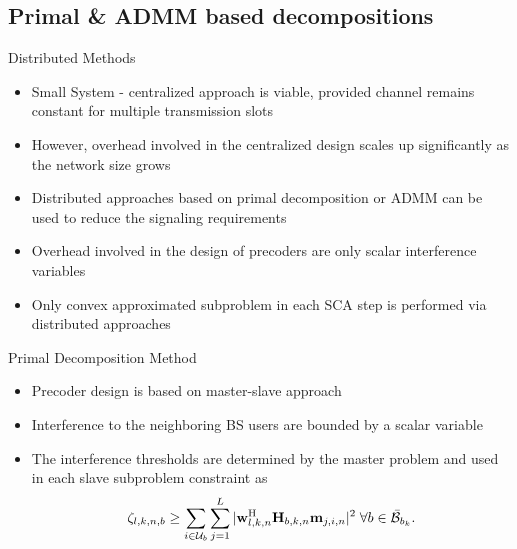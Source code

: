 \documentclass[9pt]{beamer}
\begin{document}
\subsection{Primal \& \acs{ADMM} based decompositions}

\begin{frame}{Distributed Methods}
	\begin{itemize}
		\item Small System - centralized approach is viable, provided channel remains constant for multiple transmission slots
		\item However, overhead involved in the centralized design scales up significantly as the network size grows
		\item Distributed approaches based on primal decomposition or \acs{ADMM} can be used to reduce the signaling requirements
		\item Overhead involved in the design of precoders are only scalar interference variables
		\item Only convex approximated subproblem in each \acs{SCA} step is performed via distributed approaches
	\end{itemize}
\end{frame}

\begin{frame}{Primal Decomposition Method}
	\begin{itemize}
		\item Precoder design is based on master-slave approach
		\item Interference to the neighboring \ac{BS} users are bounded by a scalar variable
		\item The interference thresholds are determined by the master problem and used in each slave subproblem constraint as
		\begin{equation} \label{inter_exp} \scriptsize
		\zeta_{l,k,n,b} \geq \sum_{i \in \mathcal{U}_b} \sum_{j = 1}^L |\mathbf{w}_{l,k,n}^{\mathrm{H}} \mathbf{H}_{b,k,n} \mathbf{m}_{j,i,n} |^2 \; \forall b \in \bar{\mathcal{B}}_{b_k}.
		\end{equation}
	\end{itemize}
\end{frame}
\end{document}
